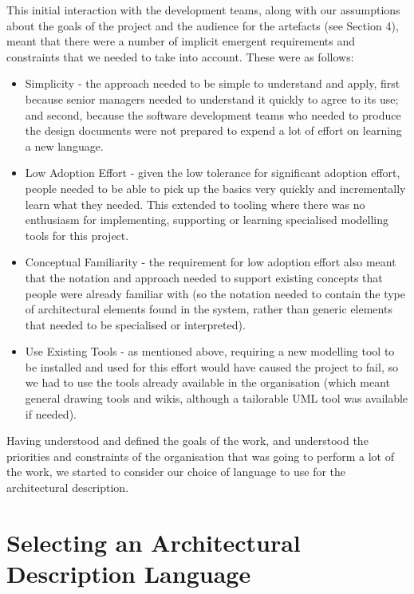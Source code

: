 This initial interaction with the development teams, along with our assumptions about the goals of the project and the audience for the artefacts (see Section 4), meant that there were a number of implicit emergent requirements and constraints that we needed to take into account.  These were as follows:

\begin{itemize}

  \item Simplicity - the approach needed to be simple to understand and apply, first because senior managers needed to understand it quickly to agree to its use; and second, because the software development teams who needed to produce the design documents were not prepared to expend a lot of effort on learning a new language.

  \item Low Adoption Effort - given the low tolerance for significant adoption effort, people needed to be able to pick up the basics very quickly and incrementally learn what they needed.  This extended to tooling where there was no enthusiasm for implementing, supporting or learning specialised modelling tools for this project.

  \item Conceptual Familiarity - the requirement for low adoption effort also meant that the notation and approach needed to support existing concepts that people were already familiar with (so the notation needed to contain the type of architectural elements found in the system, rather than generic elements that needed to be specialised or interpreted).

  \item Use Existing Tools - as mentioned above, requiring a new modelling tool to be installed and used for this effort would have caused the project to fail, so we had to use the tools already available in the organisation (which meant general drawing tools and wikis, although a tailorable UML tool was available if needed).

\end{itemize}

Having understood and defined the goals of the work, and understood the priorities and constraints of the organisation that was going to perform a lot of the work, we started to consider our choice of language to use for the architectural description.

\section{Selecting an Architectural Description Language}

